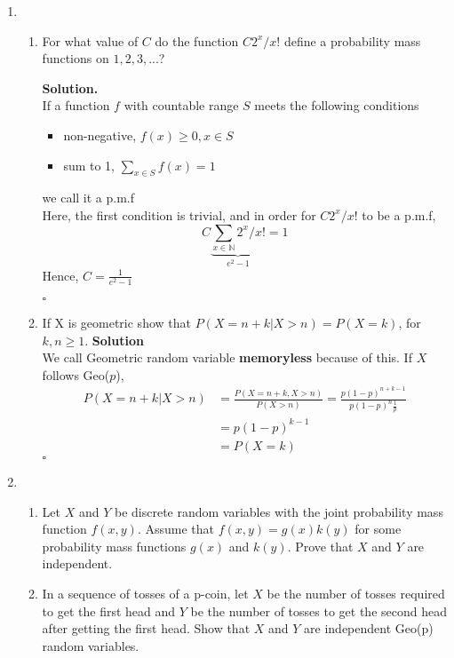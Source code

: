 \documentclass[12pt]{article}
\begin{document}
\begin{enumerate}
\item
\begin{enumerate}
\item For what value of $C$ do the function $C2^{x}/x!$  define a probability mass functions on $1,2,3,...$?

\textbf{Solution.}\\
If a function \(f\) with countable range $S$ meets the following conditions 
\begin{itemize}
    \item non-negative, \(f(x) \geq  0 , x \in S\)
    \item sum to 1, \(\sum_{x \in S} f(x) = 1 \)  
\end{itemize}
we call it a p.m.f \\
Here, the first condition is trivial, and in order for \(C2^x / x!\) to be a p.m.f, 
\[
    C \underbrace{\sum_{x \in \mathbb{N}} 2^x / x!}_{e^2 -1} = 1 
\] 
Hence, \(C = \frac{1}{e^2 -1}\) 

\hspace{\linewidth}\(\square\)   

\item
If X is geometric show that \(P(X = n + k | X > n) = P(X = k)\), for \(k,n \geq 1\).
\textbf{Solution} \\
We call Geometric random variable \textbf{memoryless} because of this. 
If \(X\) follows Geo(\(p\)), 
\begin{equation*}
   \begin{aligned}
    P(X = n+k | X > n) &= \frac{P(X = n+k, X > n)}{P(X > n)} = \frac{p(1-p)^{n+k-1}}{p(1-p)^{n} \frac{1}{p}} 
    \\ & = p(1-p)^{k-1} 
    \\ &= P(X = k)
   \end{aligned} 
\end{equation*}
\hspace{\linewidth} $\square$  
\end{enumerate}

\item
\begin{enumerate}
\item
Let $X$ and $Y$ be discrete random variables with the joint probability mass function $f(x,y)$. Assume that $f(x,y)=g(x)k(y)$ for some
probability mass functions $g(x)$ and $k(y)$. Prove that $X$ and $Y$ are independent.
\item In a sequence of tosses of a p-coin, let $X$ be the number of tosses required to get the first head and $Y$ be the number of tosses to get the second head after getting the first head. Show that $X$ and $Y$ are independent Geo(p) random variables.
\end{enumerate}


\end{enumerate}
\end{document}
